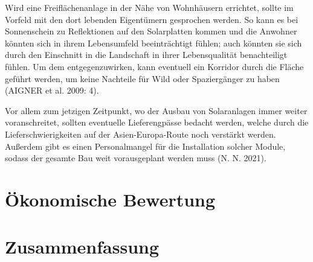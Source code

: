 \documentclass[11pt]{scrartcl}
\begin{document}
Wird eine Freiflächenanlage in der Nähe von Wohnhäusern errichtet, sollte im Vorfeld mit den dort lebenden Eigentümern gesprochen werden.
 So kann es bei Sonnenschein zu Reflektionen auf den Solarplatten kommen und die Anwohner könnten sich in ihrem Lebensumfeld beeinträchtigt fühlen; auch könnten sie sich durch den Einschnitt in die Landschaft in ihrer Lebensqualität benachteiligt fühlen.
 Um dem entgegenzuwirken, kann eventuell ein Korridor durch die Fläche geführt werden, um keine Nachteile für Wild oder Spaziergänger zu haben (AIGNER et al. 2009: 4).
 
Vor allem zum jetzigen Zeitpunkt, wo der Ausbau von Solaranlagen immer weiter voranschreitet, sollten eventuelle Lieferengpässe bedacht werden, welche durch die Lieferschwierigkeiten auf der Asien-Europa-Route noch verstärkt werden.
 Außerdem gibt es einen Personalmangel für die Installation solcher Module, sodass der gesamte Bau weit vorausgeplant werden muss (N. N. 2021).


\section{Ökonomische Bewertung}
\Blindtext

\section{Zusammenfassung}
\Blindtext
\end{document}
